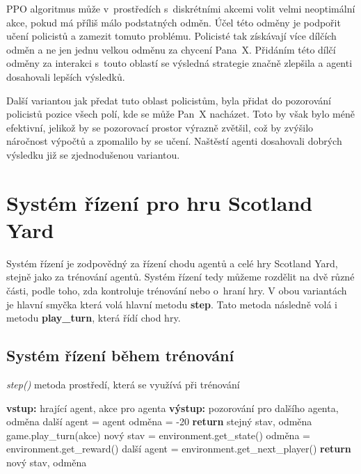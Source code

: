 PPO algoritmus může v~prostředích s~diskrétními akcemi volit velmi neoptimální akce, pokud má příliš málo podstatných odměn\cite{PPO_weakness}.
Účel této odměny je podpořit učení policistů a zamezit tomuto problému.
Policisté tak získávají více dílčích odměn a ne jen jednu velkou odměnu za chycení Pana~X\@.
Přidáním této dílčí odměny za interakci s~touto oblastí se výsledná strategie značně zlepšila a agenti dosahovali lepších výsledků.

Další variantou jak předat tuto oblast policistům, byla přidat do pozorování policistů pozice všech polí, kde se může Pan~X nacházet.
Toto by však bylo méně efektivní, jelikož by se pozorovací prostor výrazně zvětšil, což by zvýšilo náročnost výpočtů a zpomalilo by se učení.
Naštěstí agenti dosahovali dobrých výsledku již se zjednodušenou variantou.

\section{Systém řízení pro hru Scotland Yard}
\label{sec:system_rizeni}
Systém řízení je zodpovědný za řízení chodu agentů a celé hry Scotland Yard, stejně jako za trénování agentů.
Systém řízení tedy můžeme rozdělit na dvě různé části, podle toho, zda kontroluje trénování nebo o~hraní hry.
V obou variantách je hlavní smyčka která volá hlavní metodu \textbf{step}.
Tato metoda následně volá i metodu \textbf{play\_turn}, která řídí chod hry.

\subsection{Systém řízení během trénování}

\begin{algorithm}[H]
  \caption{\emph{step()} metoda prostředí, která se využívá při trénování}
  \label{alg:step}
  \begin{algorithmic}
    \State \textbf{vstup:} hrající agent, akce pro agenta
    \State \textbf{výstup:} pozorování pro dalšího agenta, odměna
    \State
    \State další agent = agent
    \State odměna = -20
    \State \textbf{return} stejný stav, odměna
    \EndIf
    \State game.play\_turn(akce)
    \State nový stav = environment.get\_state()
    \State odměna = environment.get\_reward()
    \State další agent = environment.get\_next\_player()
    \State \textbf{return} nový stav, odměna
  \end{algorithmic}
\end{algorithm}

